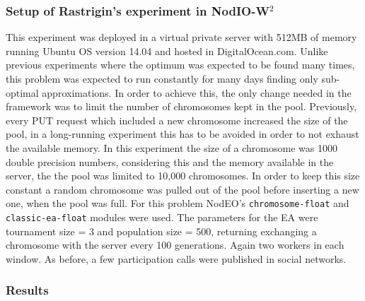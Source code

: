 \documentclass[journal,onecolumn]{IEEEtran}
\begin{document}
\subsubsection{Setup of Rastrigin's experiment in {\sf NodIO-W$^2$ }}

This experiment was deployed in a virtual private server with 512MB of memory
running Ubuntu OS version 14.04 and hosted in DigitalOcean.com. Unlike previous
experiments where the optimum was expected to be found many times, 
this problem was expected to run constantly for many days finding only
sub-optimal approximations. In order to achieve this, the only change needed 
in the framework was to limit the number of chromosomes kept in the pool. 
Previously, every PUT request which included a new chromosome increased 
the size of the pool, in a long-running experiment this has to be avoided
in order to not exhaust the available memory. In this experiment the size
of a chromosome was 1000 double precision numbers, considering this
and the memory available in the server, the the pool was limited 
to 10,000 chromosomes.  In order to keep this size
constant a random chromosome was pulled out of the pool before inserting a
new one, when the pool was full. For this problem {\sf NodEO}'s {\tt chromosome-float} 
and {\tt classic-ea-float} modules were used. The parameters for the EA 
were tournament size = 3 and  population size = 500, returning exchanging a
chromosome with the server every 100 generations. Again two workers in each window.
As before, a few participation calls were published in social networks.

\subsubsection{Results}
\end{document}
